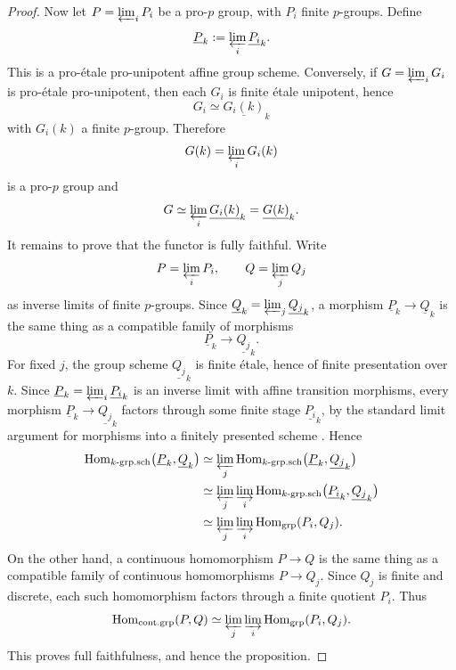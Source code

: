 \documentclass[12pt,a4]{amsart}
\theoremstyle{definition}
\newtheorem{rem}[claim]{Remark}
\begin{document}
\begin{proof}
	Now let \(P=\varprojlim_i P_i\) be a pro-\(p\) group, with \(P_i\) finite
	\(p\)-groups. Define
	\[
	\underline{P}_k:=\varprojlim_i \underline{P_i}_k .
	\]
	This is a pro-\'{e}tale pro-unipotent affine group scheme. Conversely, if
	\(G=\varprojlim_i G_i\) is pro-\'{e}tale pro-unipotent, then each \(G_i\) is
	finite \'{e}tale unipotent, hence
	\[
	G_i\simeq \underline{G_i(k)}_k
	\]
	with \(G_i(k)\) a finite \(p\)-group. Therefore
	\[
	G(k)=\varprojlim_i G_i(k)
	\]
	is a pro-\(p\) group and
	\[
	G\simeq \varprojlim_i \underline{G_i(k)}_k
	= \underline{G(k)}_k .
	\]
	It remains to prove that the functor is fully faithful. Write
	\[
	P=\varprojlim_i P_i,\qquad Q=\varprojlim_j Q_j
	\]
	as inverse limits of finite \(p\)-groups. Since
	\(\underline{Q}_k=\varprojlim_j \underline{Q_j}_k\), a morphism
	\(\underline{P}_k\to \underline{Q}_k\) is the same thing as a compatible family
	of morphisms
	\[
	\underline{P}_k\longrightarrow \underline{Q_j}_k .
	\]
	For fixed \(j\), the group scheme \(\underline{Q_j}_k\) is finite \'{e}tale,
	hence of finite presentation over \(k\). Since
	\(\underline{P}_k=\varprojlim_i \underline{P_i}_k\) is an inverse limit with
	affine transition morphisms, every morphism
	\(\underline{P}_k\to \underline{Q_j}_k\) factors through some finite stage
	\(\underline{P_i}_k\), by the standard limit argument for morphisms into a
	finitely presented scheme \cite[Tag 01ZM]{Stack}. Hence
	\[
	\begin{aligned}
		\operatorname{Hom}_{k\text{-grp.sch}}
		\bigl(\underline{P}_k,\underline{Q}_k\bigr)
		&\simeq
		\varprojlim_j
		\operatorname{Hom}_{k\text{-grp.sch}}
		\bigl(\underline{P}_k,\underline{Q_j}_k\bigr)     \\
		&\simeq
		\varprojlim_j \varinjlim_i
		\operatorname{Hom}_{k\text{-grp.sch}}
		\bigl(\underline{P_i}_k,\underline{Q_j}_k\bigr)   \\
		&\simeq
		\varprojlim_j \varinjlim_i
		\operatorname{Hom}_{\mathrm{grp}}(P_i,Q_j).
	\end{aligned}
	\]
	On the other hand, a continuous homomorphism \(P\to Q\) is the same thing as a
	compatible family of continuous homomorphisms \(P\to Q_j\). Since \(Q_j\) is
	finite and discrete, each such homomorphism factors through a finite quotient
	\(P_i\). Thus
	\[
	\operatorname{Hom}_{\mathrm{cont.grp}}(P,Q)
	\simeq
	\varprojlim_j \varinjlim_i
	\operatorname{Hom}_{\mathrm{grp}}(P_i,Q_j).
	\]
	This proves full faithfulness, and hence the proposition.
\end{proof}
\end{document}
